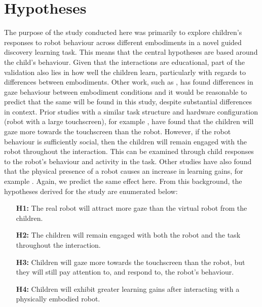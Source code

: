 \section{Hypotheses} \label{sec:ch6-hypoth}
The purpose of the study conducted here was primarily to explore children's responses to robot behaviour across different embodiments in a novel guided discovery learning task. This means that the central hypotheses are based around the child's behaviour. Given that the interactions are educational, part of the validation also lies in how well the children learn, particularly with regards to differences between embodiments. Other work, such as \cite{looije2012help}, has found differences in gaze behaviour between embodiment conditions and it would be reasonable to predict that the same will be found in this study, despite substantial differences in context. Prior studies with a similar task structure and hardware configuration (robot with a large touchscreen), for example \cite{baxter2013emergence}, have found that the children will gaze more towards the touchscreen than the robot. However, if the robot behaviour is sufficiently social, then the children will remain engaged with the robot throughout the interaction. This can be examined through child responses to the robot's behaviour and activity in the task. Other studies have also found that the physical presence of a robot causes an increase in \gls{learning} gains, for example \cite{bainbridge2008effect, leyzberg2012physical}. Again, we predict the same effect here. From this background, the hypotheses derived for the study are enumerated below:

\begin{enumerate}
	\item [\textbf{H1:}] The real robot will attract more gaze than the virtual robot from the children. 
	\item [\textbf{H2:}] The children will remain engaged with both the robot and the task throughout the interaction.
	\item [\textbf{H3:}] Children will gaze more towards the touchscreen than the robot, but they will still pay attention to, and respond to, the robot's behaviour.
	\item [\textbf{H4:}] Children will exhibit greater \gls{learning} gains after interacting with a physically embodied robot. 
\end{enumerate}

